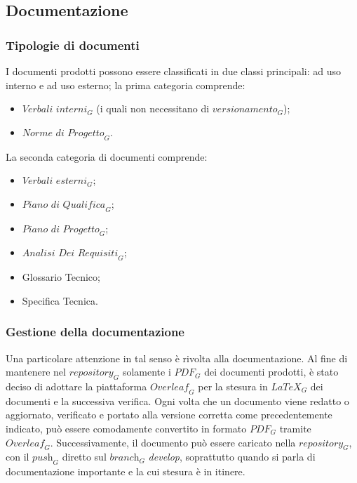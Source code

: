 \subsection{Documentazione}


\subsubsection{Tipologie di documenti}
I documenti prodotti possono essere classificati in due classi principali: ad uso interno e ad uso esterno; la prima categoria comprende:
\begin{itemize}
    \item $\textit{Verbali interni}_G$ (i quali non necessitano di $\textit{versionamento}_G$);
    \item $\textit{Norme di Progetto}_G$.
\end{itemize}
La seconda categoria di documenti comprende:
\begin{itemize}
    \item $\textit{Verbali esterni}_G$;
    \item $\textit{Piano di Qualifica}_G$;
    \item $\textit{Piano di Progetto}_G$;
    \item $\textit{Analisi Dei Requisiti}_G$;
    \item Glossario Tecnico;
    \item Specifica Tecnica.
\end{itemize}
\subsubsection{Gestione della documentazione}
Una particolare attenzione in tal senso è rivolta alla documentazione. Al fine di mantenere nel $\textit{repository}_G$ solamente i $\textit{PDF}_G$ dei documenti prodotti, è stato deciso di adottare la piattaforma \href{https://www.overleaf.com/project}{$\textit{Overleaf}_G$} per la stesura in $\textit{LaTeX}_G$ dei documenti e la successiva verifica. Ogni volta che un documento viene redatto o aggiornato, verificato e portato alla versione corretta come precedentemente indicato, può essere comodamente convertito in formato $\textit{PDF}_G$ tramite $\textit{Overleaf}_G$. Successivamente, il documento può essere caricato nella $\textit{repository}_G$, con il $\textit{push}_G$ diretto sul $\textit{branch}_G$ \textit{develop}, soprattutto quando si parla di documentazione importante e la cui stesura è in itinere.

